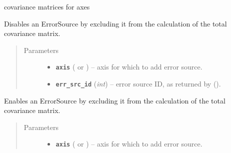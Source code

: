 \documentclass[a4paper,10pt,english]{sphinxmanual}
\begin{document}
\begin{fulllineitems}

\begin{fulllineitems}
\label{index:kafe.dataset.Dataset.cov_mats}
covariance matrices for axes

\end{fulllineitems}


\begin{fulllineitems}
\label{index:kafe.dataset.Dataset.disable_error_source}
Disables an ErrorSource by excluding it from the calculation of the
total covariance matrix.
\begin{quote}\begin{description}
\item[{Parameters}] \leavevmode\begin{itemize}
\item {} 
\textbf{\texttt{axis}} ( or ) -- axis for which to add error source.

\item {} 
\textbf{\texttt{err\_src\_id}} (\emph{int}) -- error source ID, as returned by
{\hyperref[index:kafe.dataset.Dataset.add_error_source]{\emph{}}} ().

\end{itemize}

\end{description}\end{quote}

\end{fulllineitems}


\begin{fulllineitems}
\label{index:kafe.dataset.Dataset.enable_error_source}
Enables an ErrorSource by excluding it from the calculation of the
total covariance matrix.
\begin{quote}\begin{description}
\item[{Parameters}] \leavevmode\begin{itemize}
\item {} 
\textbf{\texttt{axis}} ( or ) -- axis for which to add error source.


\end{itemize}
\end{description}
\end{quote}
\end{fulllineitems}
\end{fulllineitems}
\end{document}
